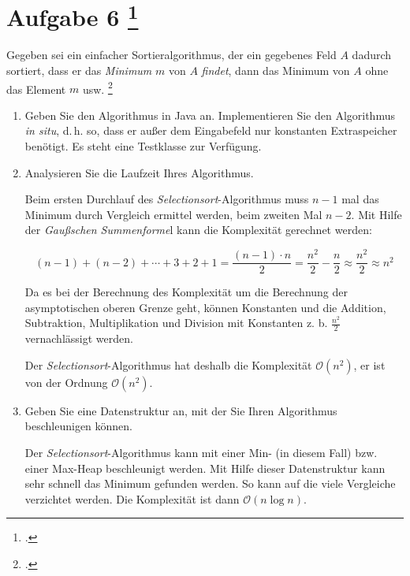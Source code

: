 \documentclass{lehramt-informatik-aufgabe}
\begin{document}
\section{Aufgabe 6
\footcite[Aufgabe 4, Seite 4]{aud:ab:3}}

Gegeben sei ein einfacher Sortieralgorithmus, der ein gegebenes Feld $A$
dadurch sortiert, dass er das \emph{Minimum} $m$ von $A$ \emph{findet},
dann das Minimum von $A$ ohne das Element $m$ usw.
\footcite[Thema 2 Aufgabe 6 Seite 5]{examen:66115:2014:09}

\begin{enumerate}


\item Geben Sie den Algorithmus in Java an.
Implementieren Sie den Algorithmus
\emph{in situ}, d.\,h. so, dass er außer dem Eingabefeld nur konstanten
Extraspeicher benötigt. Es steht eine Testklasse zur Verfügung.

\begin{antwort}
\end{antwort}


\item Analysieren Sie die Laufzeit Ihres Algorithmus.

\begin{antwort}
Beim ersten Durchlauf des \emph{Selectionsort}-Algorithmus muss $n - 1$
mal das Minimum durch Vergleich ermittel werden, beim zweiten Mal
$n - 2$.
Mit Hilfe der \emph{Gaußschen Summenforme}l kann die Komplexität
gerechnet werden:

\begin{displaymath}
(n-1)+(n-2)+\dotsb+3+2+1 =
\frac{(n-1)\cdot n}{2} =
\frac{n^2}{2}-\frac{n}{2} \approx
\frac{n^2}{2} \approx
n^2
\end{displaymath}

Da es bei der Berechnung des Komplexität um die Berechnung der
asymptotischen oberen Grenze geht, können Konstanten und die Addition,
Subtraktion, Multiplikation und Division mit Konstanten z. b.
$\frac{n^2}{2}$ vernachlässigt werden.

Der \emph{Selectionsort}-Algorithmus hat deshalb die Komplexität
$\mathcal{O}(n^2)$, er ist von der Ordnung
$\mathcal{O}(n^2)$.
\end{antwort}


\item Geben Sie eine Datenstruktur an, mit der Sie Ihren Algorithmus
beschleunigen können.

\begin{antwort}
Der \emph{Selectionsort}-Algorithmus kann mit einer Min- (in diesem
Fall) bzw. einer Max-Heap beschleunigt werden. Mit Hilfe dieser
Datenstruktur kann sehr schnell das Minimum gefunden werden. So kann auf
die viele Vergleiche verzichtet werden. Die Komplexität ist dann
$\mathcal{O}(n \log n)$.
\end{antwort}
\end{enumerate}
\end{document}

